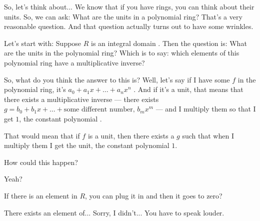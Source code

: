 \begin{speech}[00:16:30 - 00:18:16]

So, let's think about... We know that if you have rings, you can think about their units. So, we can ask: What are the units in a polynomial ring? That's a very reasonable question. And that question actually turns out to have some wrinkles.

Let's start with: Suppose $R$ is an integral domain . Then the question is: What are the units in the polynomial ring?  Which is to say: which elements of this polynomial ring have a multiplicative inverse?

So, what do you think the answer to this is? Well, let's say if I have some $f$ in the polynomial ring, it's $a_0 + a_1 x + \dots + a_n x^n$ . And if it's a unit, that means that there exists a multiplicative inverse --- there exists $g = b_0 + b_1 x + \dots + \text{some different number, } b_m x^m$  --- and I multiply them so that I get $1$, the constant polynomial .

That would mean that if $f$ is a unit, then there exists a $g$ such that when I multiply them I get the unit, the constant polynomial $1$.

How could this happen?

Yeah?
\end{speech}

\begin{student}
If there is an element in $R$, you can plug it in and then it goes to zero?
\end{student}

\begin{speech}[00:18:21 - 00:18:25]
There exists an element of... Sorry, I didn't... You have to speak louder.
\end{speech}

